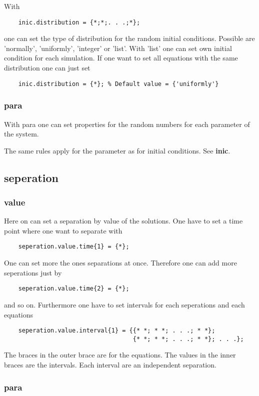 \documentclass[12pt,a4paper]{article}
\begin{document}
With 
\begin{lstlisting}
	inic.distribution = {*;*;. . .;*};
\end{lstlisting}
one can set the type of distribution for the random initial conditions. Possible are 'normally', 'uniformly', 'integer' or 'list'. With 'list' one can set own initial condition for each simulation. If one want to set all equations with the same distribution one can just set 
\begin{lstlisting}
	inic.distribution = {*}; % Default value = {'uniformly'}
\end{lstlisting}

\subsubsection*{para}
With para one can set properties for the random numbers for each parameter of the system. 

The same rules apply for the parameter as for initial conditions. See \textbf{inic}.

\subsection{seperation}
\subsubsection*{value}

Here on can set a separation by value of the solutions. One have to set a time point where one want to separate with
\begin{lstlisting}
	seperation.value.time{1} = {*};
\end{lstlisting}

One can set more the ones separations at once. Therefore one can add more seperations just by

\begin{lstlisting}
	seperation.value.time{2} = {*};
\end{lstlisting}

and so on. Furthermore one have to set intervals for each seperations and each equations

\begin{lstlisting}
	seperation.value.interval{1} = {{* *; * *; . . .; * *};
	                                {* *; * *; . . .; * *}; . . .};
\end{lstlisting}

The braces in the outer brace are for the equations. The values in the inner braces are the intervals. Each interval are an independent separation.  

\subsubsection*{para}
\end{document}
